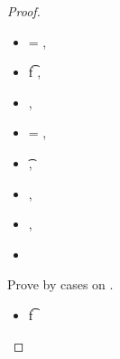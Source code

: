 \begin{lemma}
\begin{proof}
\begin{case}[B-Delta]
\begin{itemize}
\begin{subcase}[T-App]
  \begin{itemize}
    \item
  \ep{} = { {}},
    \item
  \judgementrewrite {\propenv{}} {} {\ArrowOne {\x{}} {\s{}}
                                                       {\t{f}}
                                                       {
                                                                   {}}
                                                       {}}
                {
                            {}}
                {}
                {},
    \item
  \judgementrewrite {\propenv{}}
                 {} {\s{}}
                 {
                             {}}
                 {}
                 {},
    \item
  \e{} = { {}},
    \item
      \issubtypein{}  { {} {\x{}}}{\t{}},
    \item
       {\thenprop {\prop{}}},
    \item
       {\elseprop {\prop{}}},
    \item
       {\object{}}
  \end{itemize}


  Prove by cases on \const{}.
  \begin{itemize}
    \item[] \begin{subcase}[\const{} = \classconst]
        \issubtypein{}
  {\ArrowOne {\x{}} {\Top{}}
                                      {\Union{\Nil}{\Class}}
                                      {\filterset {\topprop{}}
                                                  {\topprop{}}}
                                      {\pth {\classpe{}} {\x{}}}}
    {\ArrowOne {\x{}} {\s{}}
                                                       {\t{f}}
                                                       {
                                                                   {}}
                                                       {}}


\end{subcase}
\end{itemize}
\end{subcase}
\end{itemize}
\end{case}
\end{proof}
\end{lemma}
